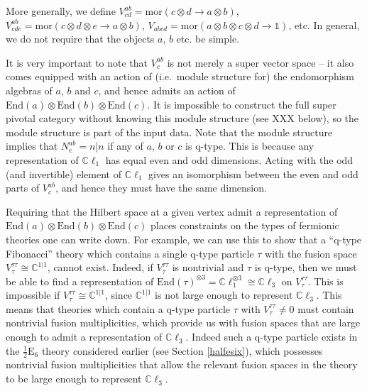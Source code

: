 \documentclass[12pt,a4paper]{article}
\newcommand{\tp}{\otimes}
\newcommand{\unit}{\mathds{1}}
\newcommand{\cc}{\mathbb{C}}
\newcommand{\mor}{\text{mor}}
\newcommand{\End}{\text{End}}
\newcommand{\cl}{\mathbb{C}\ell}
\newcommand{\halfesix}{\frac{1}{2}\text{E}_6}
\begin{document}
More generally, we define $V^{ab}_{cd} = \mor(c\tp d\to a\tp b)$, $V^{ab}_{cde} = \mor(c\tp d\tp e\to a\tp b)$,
$V_{abcd} = \mor(a\tp b\tp c\tp d\to \unit)$, etc.
In general, we do not require that the objects $a$, $b$ etc. be simple.

\medskip

It is very important to note that $V^{ab}_c$ is not merely a super vector space -- it also comes equipped with an action
of (i.e.\ module structure for) the endomorphism algebras of $a$, $b$ and $c$, and hence admits an action of $\End(a)\tp \End(b)\tp \End(c)$. 
It is impossible to construct the full super pivotal category without knowing this module structure (see XXX below), 
so the module
structure is part of the input data.
Note that the module structure implies that $N^{ab}_c = n|n$ if any of $a$, $b$ or $c$ is q-type.
This is because any representation of $\cl_1$ has equal even and odd dimensions.
Acting with the odd (and invertible) element of $\cl_1$ gives an isomorphism between the even and odd parts of $V^{ab}_c$, and hence they must have the same dimension.

Requiring that the Hilbert space at a given vertex admit a 
representation of $\End(a)\tp \End(b)\tp \End(c)$ places constraints on the types 
of fermionic theories one can write down. 
For example, we can use this to show that a ``q-type Fibonacci'' theory 
which contains a single q-type particle $\tau$ with the fusion space $V^{\tau\tau}_{\tau}\cong \cc^{1|1}$, cannot exist. 
Indeed, if $V^{\tau\tau}_{\tau}$ is nontrivial and $\tau$ is q-type, 
then we must be able to find a representation of $\End(\tau)^{\tp 3} = \cl_1^{\tp 3} \cong \cl_3$ on $V^{\tau\tau}_{\tau}$.
This is impossible if $V^{\tau\tau}_{\tau}\cong \cc^{1|1}$, since $\cc^{1|1}$ is not large enough to represent $\cl_3$. 
This means that theories which contain a q-type particle $\tau$ with $V^{\tau\tau}_{\tau}\neq0$ must contain nontrivial 
fusion multiplicities, which provide us with fusion spaces that are large enough to admit a representation of $\cl_3$.
Indeed such a q-type particle exists in the $\halfesix$ theory considered earlier (see Section \ref{halfesix}), 
which possesses nontrivial fusion multiplicities that allow the relevant fusion spaces in the theory to be large enough to represent $\cl_3$. 



\medskip
\end{document}
